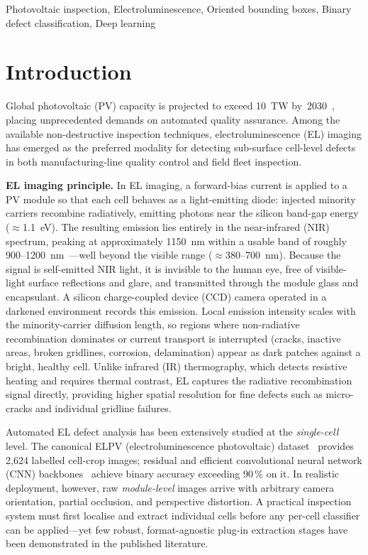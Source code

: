 \documentclass[conference]{IEEEtran}
\begin{document}
\begin{IEEEkeywords}
Photovoltaic inspection, Electroluminescence, Oriented bounding boxes, Binary defect classification, Deep learning
\end{IEEEkeywords}

\section{Introduction}

Global photovoltaic (PV) capacity is projected to exceed 10~TW by~2030~\cite{iea2023}, placing unprecedented demands on automated quality assurance. Among the available non-destructive inspection techniques, electroluminescence (EL) imaging has emerged as the preferred modality for detecting sub-surface cell-level defects in both manufacturing-line quality control and field fleet inspection.

\textbf{EL imaging principle.} In EL imaging, a forward-bias current is applied to a PV module so that each cell behaves as a light-emitting diode: injected minority carriers recombine radiatively, emitting photons near the silicon band-gap energy ($\approx$1.1~eV). The resulting emission lies entirely in the near-infrared (NIR) spectrum, peaking at approximately 1150~nm within a usable band of roughly 900--1200~nm~\cite{fuyuki2005}---well beyond the visible range ($\approx$380--700~nm). Because the signal is self-emitted NIR light, it is invisible to the human eye, free of visible-light surface reflections and glare, and transmitted through the module glass and encapsulant. A silicon charge-coupled device (CCD) camera operated in a darkened environment records this emission. Local emission intensity scales with the minority-carrier diffusion length, so regions where non-radiative recombination dominates or current transport is interrupted (cracks, inactive areas, broken gridlines, corrosion, delamination) appear as dark patches against a bright, healthy cell. Unlike infrared (IR) thermography, which detects resistive heating and requires thermal contrast, EL captures the radiative recombination signal directly, providing higher spatial resolution for fine defects such as micro-cracks and individual gridline failures.

Automated EL defect analysis has been extensively studied at the \textit{single-cell} level. The canonical ELPV (electroluminescence photovoltaic) dataset~\cite{deitsch2019} provides 2{,}624 labelled cell-crop images; residual and efficient convolutional neural network (CNN) backbones~\cite{he2016,tan2019} achieve binary accuracy exceeding 90\,\% on it. In realistic deployment, however, raw \textit{module-level} images arrive with arbitrary camera orientation, partial occlusion, and perspective distortion. A practical inspection system must first localise and extract individual cells before any per-cell classifier can be applied---yet few robust, format-agnostic plug-in extraction stages have been demonstrated in the published literature.
\end{document}
